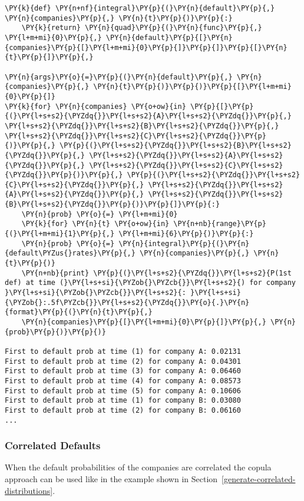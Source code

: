 \begin{tcolorbox}[breakable, size=fbox, boxrule=1pt, pad at break*=1mm,colback=cellbackground, colframe=cellborder]
\begin{Verbatim}[commandchars=\\\{\}]
\PY{k}{def} \PY{n+nf}{integral}\PY{p}{(}\PY{n}{default}\PY{p}{,} \PY{n}{companies}\PY{p}{,} \PY{n}{t}\PY{p}{)}\PY{p}{:}
    \PY{k}{return} \PY{n}{quad}\PY{p}{(}\PY{n}{func}\PY{p}{,} \PY{l+m+mi}{0}\PY{p}{,} \PY{n}{default}\PY{p}{[}\PY{n}{companies}\PY{p}{[}\PY{l+m+mi}{0}\PY{p}{]}\PY{p}{]}\PY{p}{[}\PY{n}{t}\PY{p}{]}\PY{p}{,} 

\PY{n}{args}\PY{o}{=}\PY{p}{(}\PY{n}{default}\PY{p}{,} \PY{n}{companies}\PY{p}{,} \PY{n}{t}\PY{p}{)}\PY{p}{)}\PY{p}{[}\PY{l+m+mi}{0}\PY{p}{]}
\PY{k}{for} \PY{n}{companies} \PY{o+ow}{in} \PY{p}{[}\PY{p}{(}\PY{l+s+s2}{\PYZdq{}}\PY{l+s+s2}{A}\PY{l+s+s2}{\PYZdq{}}\PY{p}{,} \PY{l+s+s2}{\PYZdq{}}\PY{l+s+s2}{B}\PY{l+s+s2}{\PYZdq{}}\PY{p}{,} \PY{l+s+s2}{\PYZdq{}}\PY{l+s+s2}{C}\PY{l+s+s2}{\PYZdq{}}\PY{p}{)}\PY{p}{,} \PY{p}{(}\PY{l+s+s2}{\PYZdq{}}\PY{l+s+s2}{B}\PY{l+s+s2}{\PYZdq{}}\PY{p}{,} \PY{l+s+s2}{\PYZdq{}}\PY{l+s+s2}{A}\PY{l+s+s2}{\PYZdq{}}\PY{p}{,} \PY{l+s+s2}{\PYZdq{}}\PY{l+s+s2}{C}\PY{l+s+s2}{\PYZdq{}}\PY{p}{)}\PY{p}{,} \PY{p}{(}\PY{l+s+s2}{\PYZdq{}}\PY{l+s+s2}{C}\PY{l+s+s2}{\PYZdq{}}\PY{p}{,} \PY{l+s+s2}{\PYZdq{}}\PY{l+s+s2}{A}\PY{l+s+s2}{\PYZdq{}}\PY{p}{,} \PY{l+s+s2}{\PYZdq{}}\PY{l+s+s2}{B}\PY{l+s+s2}{\PYZdq{}}\PY{p}{)}\PY{p}{]}\PY{p}{:}
    \PY{n}{prob} \PY{o}{=} \PY{l+m+mi}{0}
    \PY{k}{for} \PY{n}{t} \PY{o+ow}{in} \PY{n+nb}{range}\PY{p}{(}\PY{l+m+mi}{1}\PY{p}{,} \PY{l+m+mi}{6}\PY{p}{)}\PY{p}{:}
    \PY{n}{prob} \PY{o}{=} \PY{n}{integral}\PY{p}{(}\PY{n}{default\PYZus{}rates}\PY{p}{,} \PY{n}{companies}\PY{p}{,} \PY{n}{t}\PY{p}{)}
    \PY{n+nb}{print} \PY{p}{(}\PY{l+s+s2}{\PYZdq{}}\PY{l+s+s2}{P(1st def) at time (}\PY{l+s+si}{\PYZob{}\PYZcb{}}\PY{l+s+s2}{) for company }\PY{l+s+si}{\PYZob{}\PYZcb{}}\PY{l+s+s2}{: }\PY{l+s+si}{\PYZob{}:.5f\PYZcb{}}\PY{l+s+s2}{\PYZdq{}}\PY{o}{.}\PY{n}{format}\PY{p}{(}\PY{n}{t}\PY{p}{,} 
    \PY{n}{companies}\PY{p}{[}\PY{l+m+mi}{0}\PY{p}{]}\PY{p}{,} \PY{n}{prob}\PY{p}{)}\PY{p}{)}

First to default prob at time (1) for company A: 0.02131
First to default prob at time (2) for company A: 0.04301
First to default prob at time (3) for company A: 0.06460
First to default prob at time (4) for company A: 0.08573
First to default prob at time (5) for company A: 0.10606
First to default prob at time (1) for company B: 0.03080
First to default prob at time (2) for company B: 0.06160
...
\end{Verbatim}
\end{tcolorbox}

\subsubsection{Correlated Defaults}\label{correlated-defaults}
When the default probabilities of the companies are correlated the copula approach can be used like in the example shown in Section~\ref{generate-correlated-distributions}.

